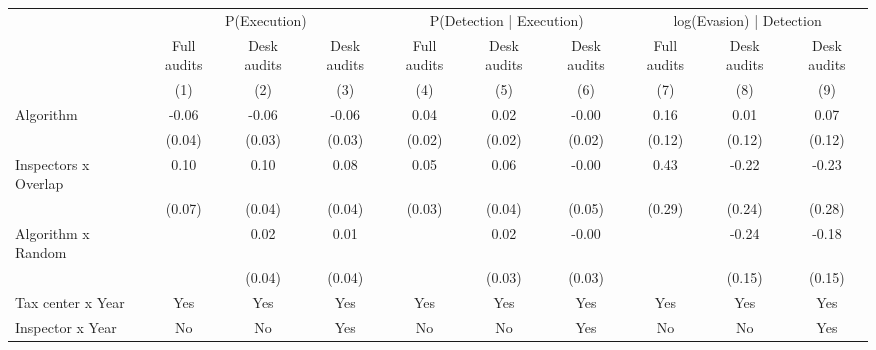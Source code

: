 \begin{tabular}{lccc|ccc|ccc} \toprule
\multicolumn{1}{l}{} & \multicolumn{3}{c}{P(Execution)} & \multicolumn{3}{c}{P(Detection | Execution)} & \multicolumn{3}{c}{log(Evasion) | Detection} \\\cmidrule(lr){2-4}\cmidrule(lr){5-7}\cmidrule(lr){8-10} \multicolumn{1}{l}{} & Full audits & Desk audits & Desk audits & Full audits & Desk audits & Desk audits & Full audits & Desk audits & Desk audits \\ \multicolumn{1}{l}{} & (1) & (2) & (3) & (4) & (5) & (6) & (7) & (8) & (9) \\ \midrule
Algorithm   &       -0.06\sym{*}  &       -0.06\sym{**} &       -0.06\sym{**} &        0.04\sym{**} &        0.02         &       -0.00         &        0.16         &        0.01         &        0.07         \\
            &      (0.04)         &      (0.03)         &      (0.03)         &      (0.02)         &      (0.02)         &      (0.02)         &      (0.12)         &      (0.12)         &      (0.12)         \\
\addlinespace
Inspectors x Overlap&        0.10         &        0.10\sym{**} &        0.08\sym{*}  &        0.05         &        0.06\sym{*}  &       -0.00         &        0.43         &       -0.22         &       -0.23         \\
            &      (0.07)         &      (0.04)         &      (0.04)         &      (0.03)         &      (0.04)         &      (0.05)         &      (0.29)         &      (0.24)         &      (0.28)         \\
\addlinespace
Algorithm x Random&                     &        0.02         &        0.01         &                     &        0.02         &       -0.00         &                     &       -0.24         &       -0.18         \\
            &                     &      (0.04)         &      (0.04)         &                     &      (0.03)         &      (0.03)         &                     &      (0.15)         &      (0.15)         \\
\midrule
Tax center x Year&         Yes         &         Yes         &         Yes         &         Yes         &         Yes         &         Yes         &         Yes         &         Yes         &         Yes         \\
Inspector x Year&          No         &          No         &         Yes         &          No         &          No         &         Yes         &          No         &          No         &         Yes         \\

\end{tabular}
